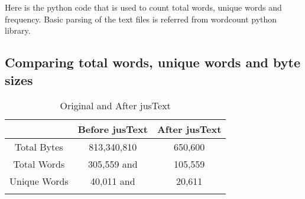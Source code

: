 Here is the python code that is used to count total words, unique words and frequency. Basic parsing of the text files
is referred from wordcount python library\cite{Wordcount}.


\newpage 
\subsection{Comparing total words, unique words and byte sizes}


\begin{table}
\caption{Original and After jusText}
\begin{center}
  \begin{tabular}{ c | c | c }
    \hline
     & Before jusText & After jusText \\ \hline
Total Bytes & 813,340,810   &  650,600  \\ \hline
Total Words & 305,559 and & 105,559 \\ \hline
Unique Words & 40,011 and & 20,611 \\ 
\label{table:comparision}
 \end{tabular}
 \end{center}

\end{table}

